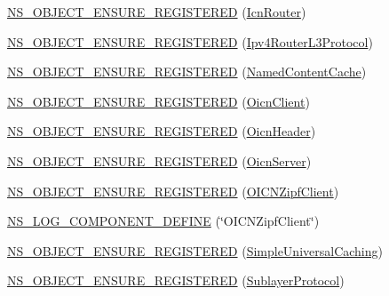\begin{DoxyCompactItemize}
\item 
\hyperlink{namespacens3_acbb68d2034dc3902cee0df5508ca8e9b}{N\-S\-\_\-\-O\-B\-J\-E\-C\-T\-\_\-\-E\-N\-S\-U\-R\-E\-\_\-\-R\-E\-G\-I\-S\-T\-E\-R\-E\-D} (\hyperlink{classns3_1_1IcnRouter}{Icn\-Router})
\item 
\hyperlink{namespacens3_ae38be77e7e591e3f607c3adab9edbead}{N\-S\-\_\-\-O\-B\-J\-E\-C\-T\-\_\-\-E\-N\-S\-U\-R\-E\-\_\-\-R\-E\-G\-I\-S\-T\-E\-R\-E\-D} (\hyperlink{classns3_1_1Ipv4RouterL3Protocol}{Ipv4\-Router\-L3\-Protocol})
\item 
\hyperlink{namespacens3_aeef94ca03b6f6aedeb2e56a2a89dcfb3}{N\-S\-\_\-\-O\-B\-J\-E\-C\-T\-\_\-\-E\-N\-S\-U\-R\-E\-\_\-\-R\-E\-G\-I\-S\-T\-E\-R\-E\-D} (\hyperlink{classns3_1_1NamedContentCache}{Named\-Content\-Cache})
\item 
\hyperlink{namespacens3_a180cc56188c0e63295439f2f58246f48}{N\-S\-\_\-\-O\-B\-J\-E\-C\-T\-\_\-\-E\-N\-S\-U\-R\-E\-\_\-\-R\-E\-G\-I\-S\-T\-E\-R\-E\-D} (\hyperlink{classns3_1_1OicnClient}{Oicn\-Client})
\item 
\hyperlink{namespacens3_ad2212d0dcd1ccd20c6030d2c76e196c7}{N\-S\-\_\-\-O\-B\-J\-E\-C\-T\-\_\-\-E\-N\-S\-U\-R\-E\-\_\-\-R\-E\-G\-I\-S\-T\-E\-R\-E\-D} (\hyperlink{classns3_1_1OicnHeader}{Oicn\-Header})
\item 
\hyperlink{namespacens3_abb83fe630e3f65b883af1bcf508dac71}{N\-S\-\_\-\-O\-B\-J\-E\-C\-T\-\_\-\-E\-N\-S\-U\-R\-E\-\_\-\-R\-E\-G\-I\-S\-T\-E\-R\-E\-D} (\hyperlink{classns3_1_1OicnServer}{Oicn\-Server})
\item 
\hyperlink{namespacens3_a26e378a3dcc3dd94128b88d95d55f5d2}{N\-S\-\_\-\-O\-B\-J\-E\-C\-T\-\_\-\-E\-N\-S\-U\-R\-E\-\_\-\-R\-E\-G\-I\-S\-T\-E\-R\-E\-D} (\hyperlink{classns3_1_1OICNZipfClient}{O\-I\-C\-N\-Zipf\-Client})
\item 
\hyperlink{namespacens3_a2be7b55fe7376e277afb8f71327b9d05}{N\-S\-\_\-\-L\-O\-G\-\_\-\-C\-O\-M\-P\-O\-N\-E\-N\-T\-\_\-\-D\-E\-F\-I\-N\-E} (\char`\"{}O\-I\-C\-N\-Zipf\-Client\char`\"{})
\item 
\hyperlink{namespacens3_a11d4fd8e7336cda6fe2fb537c212ef34}{N\-S\-\_\-\-O\-B\-J\-E\-C\-T\-\_\-\-E\-N\-S\-U\-R\-E\-\_\-\-R\-E\-G\-I\-S\-T\-E\-R\-E\-D} (\hyperlink{classns3_1_1SimpleUniversalCaching}{Simple\-Universal\-Caching})
\item 
\hyperlink{namespacens3_a5b24363261fa57f25abe3ebab1c4f6e9}{N\-S\-\_\-\-O\-B\-J\-E\-C\-T\-\_\-\-E\-N\-S\-U\-R\-E\-\_\-\-R\-E\-G\-I\-S\-T\-E\-R\-E\-D} (\hyperlink{classns3_1_1SublayerProtocol}{Sublayer\-Protocol})
\end{DoxyCompactItemize}
